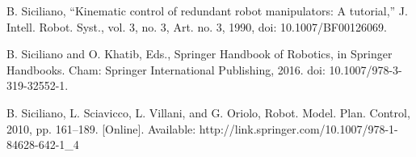 \documentclass[letterpaper, 10 pt, conference]{ieeeconf}  %
\begin{document}
\begin{thebibliography}{99}
 B. Siciliano, “Kinematic control of redundant robot manipulators: A tutorial,” J. Intell. Robot. Syst., vol. 3, no. 3, Art. no. 3, 1990, doi: 10.1007/BF00126069.

 B. Siciliano and O. Khatib, Eds., Springer Handbook of Robotics, in Springer Handbooks. Cham: Springer International Publishing, 2016. doi: 10.1007/978-3-319-32552-1.

 B. Siciliano, L. Sciavicco, L. Villani, and G. Oriolo, Robot. Model. Plan. Control, 2010, pp. 161–189. [Online]. Available: http://link.springer.com/10.1007/978-1-84628-642-1\_4






\end{thebibliography}
\end{document}
